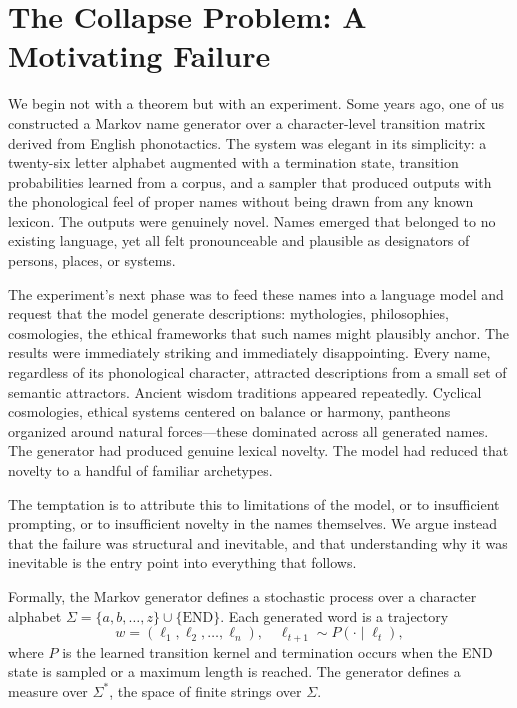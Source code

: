 \documentclass[12pt, a4paper]{article}
\theoremstyle{plain}
\theoremstyle{definition}
\theoremstyle{remark}
\begin{document}
\newpage
\tableofcontents
\newpage

\section{The Collapse Problem: A Motivating Failure}

We begin not with a theorem but with an experiment. Some years ago, one of us constructed a Markov name generator over a character-level transition matrix derived from English phonotactics. The system was elegant in its simplicity: a twenty-six letter alphabet augmented with a termination state, transition probabilities learned from a corpus, and a sampler that produced outputs with the phonological feel of proper names without being drawn from any known lexicon. The outputs were genuinely novel. Names emerged that belonged to no existing language, yet all felt pronounceable and plausible as designators of persons, places, or systems.

The experiment's next phase was to feed these names into a language model and request that the model generate descriptions: mythologies, philosophies, cosmologies, the ethical frameworks that such names might plausibly anchor. The results were immediately striking and immediately disappointing. Every name, regardless of its phonological character, attracted descriptions from a small set of semantic attractors. Ancient wisdom traditions appeared repeatedly. Cyclical cosmologies, ethical systems centered on balance or harmony, pantheons organized around natural forces---these dominated across all generated names. The generator had produced genuine lexical novelty. The model had reduced that novelty to a handful of familiar archetypes.

The temptation is to attribute this to limitations of the model, or to insufficient prompting, or to insufficient novelty in the names themselves. We argue instead that the failure was structural and inevitable, and that understanding why it was inevitable is the entry point into everything that follows.

Formally, the Markov generator defines a stochastic process over a character alphabet $\Sigma = \{a, b, \dots, z\} \cup \{\mathrm{END}\}$. Each generated word is a trajectory
\[
w = (\ell_1, \ell_2, \dots, \ell_n), \quad \ell_{t+1} \sim P(\cdot \mid \ell_t),
\]
where $P$ is the learned transition kernel and termination occurs when the END state is sampled or a maximum length is reached. The generator defines a measure over $\Sigma^*$, the space of finite strings over $\Sigma$.
\end{document}
